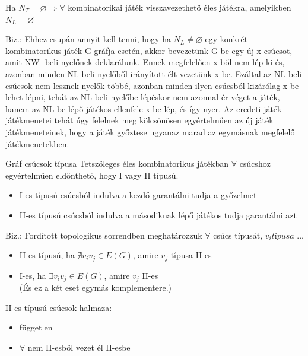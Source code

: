 	\begin{observation}{}{}
		Ha $N_T = \varnothing \Rightarrow \forall$ kombinatorikai játék visszavezethető éles játékra, amelyikben $N_L = \varnothing$
	\end{observation}
	
	Biz.: Ehhez csupán annyit kell tenni, hogy ha $N_L \neq \varnothing$
	egy konkrét kombinatorikus játék G gráfja esetén, akkor bevezetünk G-be egy új x csúcsot, amit NW -beli nyelőnek deklarálunk. Ennek megfelelően x-ből nem lép ki és, azonban minden NL-beli nyelőből irányított élt vezetünk x-be. Ezáltal az NL-beli csúcsok nem lesznek	nyelők többé, azonban minden ilyen csúcsból kizárólag x-be lehet lépni, tehát az NL-beli nyelőbe lépéskor nem azonnal ér véget a játék, hanem az NL-be lépő játékos ellenfele x-be lép, és így nyer. Az eredeti játék játékmenetei tehát úgy felelnek meg kölcsönösen egyértelműen az új játék játékmeneteinek, hogy a játék győztese ugyanaz marad az egymásnak megfelelő játékmenetekben.
	\begin{theorem}{Gráf csúcsok típusa}{}
		Tetszőleges éles kombinatorikus játékban $\forall$ csúcshoz egyértelműen eldönthető, hogy I vagy II típusú.
	\end{theorem}
	
	\begin{itemize}
		\item I-es típusú csúcsból indulva a kezdő garantálni tudja a győzelmet
		\item II-es típusú csúcsból indulva a másodiknak lépő játékos tudja garantálni azt
	\end{itemize}
	
	Biz.: Fordított topologikus sorrendben meghatározzuk $\forall$ csúcs típusát,
	$v_i típusa$ ...
	\begin{itemize}
		\item II-es típusú, ha $\nexists v_iv_j \in E(G)$, amire $v_j$ típusa II-es
		\item  I-es, ha $\exists v_iv_j \in E(G)$, amire $v_j$ II-es\\
		(És ez a két eset egymás komplementere.)
	\end{itemize}
	
	
	\begin{observation}{}{}
		II-es típusú csúcsok halmaza:
		\begin{itemize}
			\item független 
			\item $\forall$ nem II-esből vezet él II-esbe
		\end{itemize}
	\end{observation}
	
